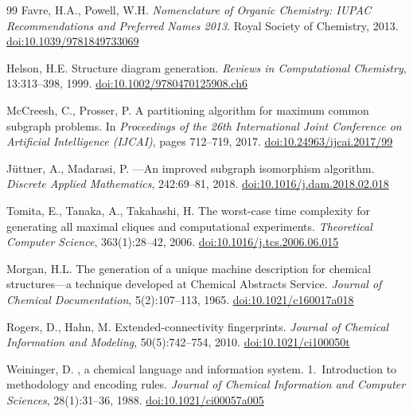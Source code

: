 \documentclass[twocolumn]{article}
\begin{document}
\begin{thebibliography}{99}
Favre, H.A., Powell, W.H.
\newblock \emph{Nomenclature of Organic Chemistry: IUPAC Recommendations and
  Preferred Names 2013}.
\newblock Royal Society of Chemistry, 2013.
\newblock \href{https://doi.org/10.1039/9781849733069}{doi:10.1039/9781849733069}

Helson, H.E.
\newblock Structure diagram generation.
\newblock \emph{Reviews in Computational Chemistry}, 13:313--398, 1999.
\newblock \href{https://doi.org/10.1002/9780470125908.ch6}{doi:10.1002/9780470125908.ch6}

McCreesh, C., Prosser, P.
\newblock A partitioning algorithm for maximum common subgraph problems.
\newblock In \emph{Proceedings of the 26th International Joint Conference on
  Artificial Intelligence (IJCAI)}, pages 712--719, 2017.
\newblock \href{https://doi.org/10.24963/ijcai.2017/99}{doi:10.24963/ijcai.2017/99}

J\"uttner, A., Madarasi, P.
---An improved subgraph isomorphism algorithm.
\newblock \emph{Discrete Applied Mathematics}, 242:69--81, 2018.
\newblock \href{https://doi.org/10.1016/j.dam.2018.02.018}{doi:10.1016/j.dam.2018.02.018}

Tomita, E., Tanaka, A., Takahashi, H.
\newblock The worst-case time complexity for generating all maximal cliques and
  computational experiments.
\newblock \emph{Theoretical Computer Science}, 363(1):28--42, 2006.
\newblock \href{https://doi.org/10.1016/j.tcs.2006.06.015}{doi:10.1016/j.tcs.2006.06.015}

Morgan, H.L.
\newblock The generation of a unique machine description for chemical
  structures---a technique developed at Chemical Abstracts Service.
\newblock \emph{Journal of Chemical Documentation}, 5(2):107--113, 1965.
\newblock \href{https://doi.org/10.1021/c160017a018}{doi:10.1021/c160017a018}

Rogers, D., Hahn, M.
\newblock Extended-connectivity fingerprints.
\newblock \emph{Journal of Chemical Information and Modeling}, 50(5):742--754, 2010.
\newblock \href{https://doi.org/10.1021/ci100050t}{doi:10.1021/ci100050t}

Weininger, D.
, a chemical language and information system. 1.~Introduction
  to methodology and encoding rules.
\newblock \emph{Journal of Chemical Information and Computer Sciences},
  28(1):31--36, 1988.
\newblock \href{https://doi.org/10.1021/ci00057a005}{doi:10.1021/ci00057a005}


\end{thebibliography}
\end{document}

